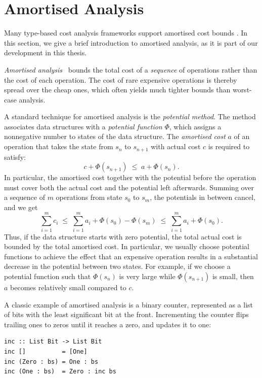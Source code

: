 \section{Amortised Analysis}
\label{sec:bg-amortised}
Many type-based cost analysis frameworks support
amortised cost bounds \citep{hofmannJ03, JostHLH10, Danielsson08}.
In this section, we give a brief introduction to amortised analysis, as it is part of our development in this thesis.

\emph{Amortised analysis}~\citep{tarjan85} bounds the total cost of a
\emph{sequence} of operations rather than the cost of each operation. 
The cost of rare expensive operations is thereby spread over the
cheap ones, which often yields much tighter bounds than worst-case analysis.

A standard technique for amortised analysis is the \emph{potential
method}. The method associates data structures with a \emph{potential function} $\Phi$, which assigns a
nonnegative number to states of the data structure. The \emph{amortised cost}
$a$ of an operation that takes the state from $s_n$ to $s_{n+1}$ with actual cost
$c$ is required to satisfy:
\[
  c + \Phi(s_{n+1}) \;\le\; a + \Phi(s_n).
\]
In particular, the amortised cost together with the potential before the
operation must cover both the actual cost and the potential left afterwards.
Summing over a sequence of $m$ operations from state $s_0$ to $s_m$, the
potentials in between cancel, and we get
\[
  \sum_{i=1}^{m} c_i \;\le\; \sum_{i=1}^{m} a_i + \Phi(s_0) - \Phi(s_m)
  \;\le\; \sum_{i=1}^{m} a_i + \Phi(s_0).
\]
Thus, if the data structure starts with zero potential, the total actual cost is
bounded by the total amortised cost. In particular, we usually choose potential functions to achieve the effect that an expensive operation
results in a substantial decrease in the potential between two states. For example, if we choose a potential function such that $\Phi(s_n)$ is very large while 
$\Phi(s_{n+1})$ is small, then $a$ becomes relatively small compared to $c$.

A classic example of amortised analysis is a binary counter, represented as a list of bits with
the least significant bit at the front. Incrementing the counter flips trailing
ones to zeros until it reaches a zero, and updates it to one:

\begin{lstlisting}[style=hs]
inc :: List Bit -> List Bit
inc []          = [One]
inc (Zero : bs) = One : bs
inc (One : bs)  = Zero : inc bs
\end{lstlisting}

